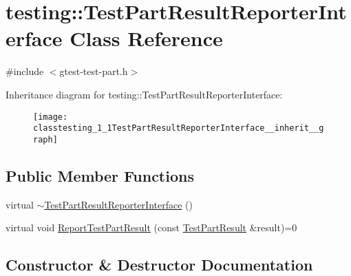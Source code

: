 \hypertarget{classtesting_1_1TestPartResultReporterInterface}{}\section{testing\+:\+:Test\+Part\+Result\+Reporter\+Interface Class Reference}
\label{classtesting_1_1TestPartResultReporterInterface}


{\ttfamily \#include $<$gtest-\/test-\/part.\+h$>$}



Inheritance diagram for testing\+:\+:Test\+Part\+Result\+Reporter\+Interface\+:\nopagebreak
\begin{figure}[H]
\begin{center}
\leavevmode
\texttt{[image: classtesting\_1\_1TestPartResultReporterInterface\_\_inherit\_\_graph]}
\end{center}
\end{figure}
\subsection*{Public Member Functions}
\begin{DoxyCompactItemize}
\item 
virtual \hyperlink{classtesting_1_1TestPartResultReporterInterface_a338b51591ed654f84dc0feaaf2b66917}{$\sim$\+Test\+Part\+Result\+Reporter\+Interface} ()
\item 
virtual void \hyperlink{classtesting_1_1TestPartResultReporterInterface_aa2f920e7a5a0a6d0faf19e3727928c22}{Report\+Test\+Part\+Result} (const \hyperlink{classtesting_1_1TestPartResult}{Test\+Part\+Result} \&result)=0
\end{DoxyCompactItemize}


\subsection{Constructor \& Destructor Documentation}
